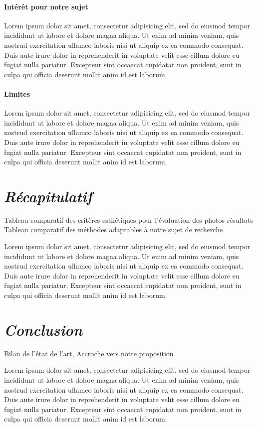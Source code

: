 \documentclass[11pt, french]{report-rd-info}
\begin{document}
\paragraph{Intérêt pour notre sujet }
Lorem ipsum dolor sit amet, consectetur adipisicing elit, sed do eiusmod tempor incididunt ut labore et dolore magna aliqua. Ut enim ad minim veniam, quis nostrud exercitation ullamco laboris nisi ut aliquip ex ea commodo consequat. Duis aute irure dolor in reprehenderit in voluptate velit esse cillum dolore eu fugiat nulla pariatur. Excepteur sint occaecat cupidatat non proident, sunt in culpa qui officia deserunt mollit anim id est laborum.

\paragraph{Limites }
Lorem ipsum dolor sit amet, consectetur adipisicing elit, sed do eiusmod tempor incididunt ut labore et dolore magna aliqua. Ut enim ad minim veniam, quis nostrud exercitation ullamco laboris nisi ut aliquip ex ea commodo consequat. Duis aute irure dolor in reprehenderit in voluptate velit esse cillum dolore eu fugiat nulla pariatur. Excepteur sint occaecat cupidatat non proident, sunt in culpa qui officia deserunt mollit anim id est laborum.


\section{\emph{Récapitulatif}}

Tableau comparatif des critères esthétiques pour l’évaluation des photos résultats
Tableau comparatif des méthodes adaptables à notre sujet de recherche

Lorem ipsum dolor sit amet, consectetur adipisicing elit, sed do eiusmod tempor incididunt ut labore et dolore magna aliqua. Ut enim ad minim veniam, quis nostrud exercitation ullamco laboris nisi ut aliquip ex ea commodo consequat. Duis aute irure dolor in reprehenderit in voluptate velit esse cillum dolore eu fugiat nulla pariatur. Excepteur sint occaecat cupidatat non proident, sunt in culpa qui officia deserunt mollit anim id est laborum.

\section{\emph{Conclusion}}
Bilan de l’état de l’art, Accroche vers notre proposition

Lorem ipsum dolor sit amet, consectetur adipisicing elit, sed do eiusmod tempor incididunt ut labore et dolore magna aliqua. Ut enim ad minim veniam, quis nostrud exercitation ullamco laboris nisi ut aliquip ex ea commodo consequat. Duis aute irure dolor in reprehenderit in voluptate velit esse cillum dolore eu fugiat nulla pariatur. Excepteur sint occaecat cupidatat non proident, sunt in culpa qui officia deserunt mollit anim id est laborum.
\end{document}
